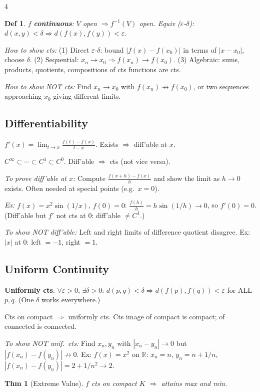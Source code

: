 \documentclass[9pt,landscape]{extarticle}
\newcommand{\R}{\mathbb{R}}
\newcommand{\eps}{\varepsilon}
\theoremstyle{compact}
\newtheorem*{thm}{Thm}
\theoremstyle{defnstyle}
\newtheorem*{defn}{Def}
\begin{document}
\begin{multicols}{4}
\begin{defn}
$f$ \textbf{continuous}: $V$ open $\Rightarrow f^{-1}(V)$ open. Equiv ($\eps$-$\delta$): $d(x,y)<\delta \Rightarrow d(f(x),f(y))<\eps$.
\end{defn}

\textit{How to show cts:} (1) Direct $\eps$-$\delta$: bound $|f(x)-f(x_0)|$ in terms of $|x-x_0|$, choose $\delta$. (2) Sequential: $x_n \to x_0 \Rightarrow f(x_n)\to f(x_0)$. (3) Algebraic: sums, products, quotients, compositions of cts functions are cts.

\textit{How to show NOT cts:} Find $x_n \to x_0$ with $f(x_n) \not\to f(x_0)$, or two sequences approaching $x_0$ giving different limits.

\subsection{Differentiability}
$f'(x) = \lim_{t \to x}\frac{f(t)-f(x)}{t-x}$. Exists $\Rightarrow$ diff'able at $x$.

$C^\infty \subset \cdots \subset C^1 \subset C^0$. Diff'able $\Rightarrow$ cts (not vice versa).

\textit{To prove diff'able at $x$:} Compute $\frac{f(x+h)-f(x)}{h}$ and show the limit as $h\to 0$ exists. Often needed at special points (e.g.\ $x=0$).

\textit{Ex:} $f(x)=x^2\sin(1/x)$, $f(0)=0$: $\frac{f(h)}{h} = h\sin(1/h) \to 0$, so $f'(0)=0$. (Diff'able but $f'$ not cts at $0$: diff'able $\neq C^1$.)

\textit{To show NOT diff'able:} Left and right limits of difference quotient disagree. Ex: $|x|$ at $0$: left $= -1$, right $= 1$.

\subsection{Uniform Continuity}
\textbf{Uniformly cts}: $\forall\eps>0$, $\exists\delta>0$: $d(p,q)<\delta \Rightarrow d(f(p),f(q))<\eps$ for ALL $p,q$. (One $\delta$ works everywhere.)

Cts on compact $\Rightarrow$ uniformly cts. Cts image of compact is compact; of connected is connected.

\textit{To show NOT unif.\ cts:} Find $x_n, y_n$ with $|x_n-y_n|\to 0$ but $|f(x_n)-f(y_n)|\not\to 0$. Ex: $f(x)=x^2$ on $\R$: $x_n=n$, $y_n=n+1/n$, $|f(x_n)-f(y_n)| = 2+1/n^2 \to 2$.

\begin{highlight}
\begin{thm}[Extreme Value]
$f$ cts on compact $K$ $\Rightarrow$ attains max and min.
\end{thm}
\end{highlight}


\end{multicols}
\end{document}
